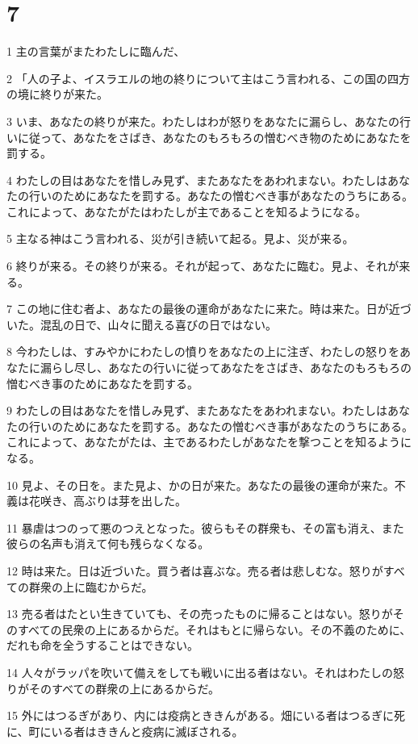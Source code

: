 \chapter{7}

\par 1 主の言葉がまたわたしに臨んだ、
\par 2 「人の子よ、イスラエルの地の終りについて主はこう言われる、この国の四方の境に終りが来た。
\par 3 いま、あなたの終りが来た。わたしはわが怒りをあなたに漏らし、あなたの行いに従って、あなたをさばき、あなたのもろもろの憎むべき物のためにあなたを罰する。
\par 4 わたしの目はあなたを惜しみ見ず、またあなたをあわれまない。わたしはあなたの行いのためにあなたを罰する。あなたの憎むべき事があなたのうちにある。これによって、あなたがたはわたしが主であることを知るようになる。
\par 5 主なる神はこう言われる、災が引き続いて起る。見よ、災が来る。
\par 6 終りが来る。その終りが来る。それが起って、あなたに臨む。見よ、それが来る。
\par 7 この地に住む者よ、あなたの最後の運命があなたに来た。時は来た。日が近づいた。混乱の日で、山々に聞える喜びの日ではない。
\par 8 今わたしは、すみやかにわたしの憤りをあなたの上に注ぎ、わたしの怒りをあなたに漏らし尽し、あなたの行いに従ってあなたをさばき、あなたのもろもろの憎むべき事のためにあなたを罰する。
\par 9 わたしの目はあなたを惜しみ見ず、またあなたをあわれまない。わたしはあなたの行いのためにあなたを罰する。あなたの憎むべき事があなたのうちにある。これによって、あなたがたは、主であるわたしがあなたを撃つことを知るようになる。
\par 10 見よ、その日を。また見よ、かの日が来た。あなたの最後の運命が来た。不義は花咲き、高ぶりは芽を出した。
\par 11 暴虐はつのって悪のつえとなった。彼らもその群衆も、その富も消え、また彼らの名声も消えて何も残らなくなる。
\par 12 時は来た。日は近づいた。買う者は喜ぶな。売る者は悲しむな。怒りがすべての群衆の上に臨むからだ。
\par 13 売る者はたとい生きていても、その売ったものに帰ることはない。怒りがそのすべての民衆の上にあるからだ。それはもとに帰らない。その不義のために、だれも命を全うすることはできない。
\par 14 人々がラッパを吹いて備えをしても戦いに出る者はない。それはわたしの怒りがそのすべての群衆の上にあるからだ。
\par 15 外にはつるぎがあり、内には疫病とききんがある。畑にいる者はつるぎに死に、町にいる者はききんと疫病に滅ぼされる。
